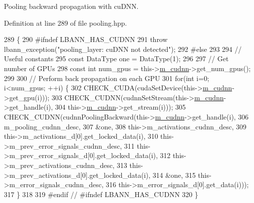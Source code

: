 Pooling backward propagation with cu\+D\+NN. 



Definition at line 289 of file pooling.\+hpp.


\begin{DoxyCode}
289                           \{    
290 \textcolor{preprocessor}{  #ifndef LBANN\_HAS\_CUDNN}
291     \textcolor{keywordflow}{throw} lbann\_exception(\textcolor{stringliteral}{"pooling\_layer: cuDNN not detected"});
292 \textcolor{preprocessor}{  #else}
293 
294     \textcolor{comment}{// Useful constants}
295     \textcolor{keyword}{const} DataType one = DataType(1);
296 
297     \textcolor{comment}{// Get number of GPUs}
298     \textcolor{keyword}{const} \textcolor{keywordtype}{int} num\_gpus = this->\hyperlink{classlbann_1_1Layer_a08dbb94239e3b8c96329786c57c72e21}{m\_cudnn}->get\_num\_gpus();
299 
300     \textcolor{comment}{// Perform back propagation on each GPU}
301     \textcolor{keywordflow}{for}(\textcolor{keywordtype}{int} i=0; i<num\_gpus; ++i) \{
302       CHECK\_CUDA(cudaSetDevice(this->\hyperlink{classlbann_1_1Layer_a08dbb94239e3b8c96329786c57c72e21}{m\_cudnn}->get\_gpu(i)));
303       CHECK\_CUDNN(cudnnSetStream(this->\hyperlink{classlbann_1_1Layer_a08dbb94239e3b8c96329786c57c72e21}{m\_cudnn}->get\_handle(i),
304                                  this->\hyperlink{classlbann_1_1Layer_a08dbb94239e3b8c96329786c57c72e21}{m\_cudnn}->get\_stream(i)));
305       CHECK\_CUDNN(cudnnPoolingBackward(this->\hyperlink{classlbann_1_1Layer_a08dbb94239e3b8c96329786c57c72e21}{m\_cudnn}->get\_handle(i),
306                                        m\_pooling\_cudnn\_desc,
307                                        &one,
308                                        this->m\_activations\_cudnn\_desc,
309                                        this->m\_activations\_d[0].get\_locked\_data(i),
310                                        this->m\_prev\_error\_signals\_cudnn\_desc,
311                                        this->m\_prev\_error\_signals\_d[0].get\_locked\_data(i),
312                                        this->m\_prev\_activations\_cudnn\_desc,
313                                        this->m\_prev\_activations\_d[0].get\_locked\_data(i),
314                                        &one,
315                                        this->m\_error\_signals\_cudnn\_desc,
316                                        this->m\_error\_signals\_d[0].get\_data(i)));
317     \}
318 
319 \textcolor{preprocessor}{  #endif // #ifndef LBANN\_HAS\_CUDNN}
320   \}
\end{DoxyCode}
